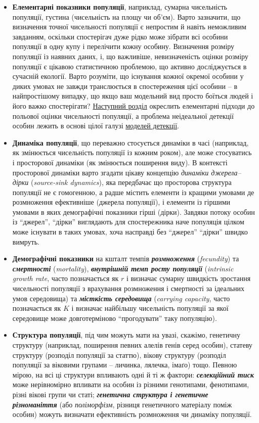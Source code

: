 \documentclass[
  11pt,
]{book}
\begin{document}
\begin{itemize}
\item
  \textbf{Елементарні показники популяції}, наприклад, сумарна чисельність популяції, густина (чисельність на площу чи об'єм). Варто зазначити, що визначення точної чисельності популяції є непростим й навіть неможливим завданням, оскільки спостерігач дуже рідко може зібрати всі особини популяції в одну купу і перелічити кожну особину. Визначення розміру популяції із наявних даних, і, що важливіше, невизначеність оцінки розміру популяції є цікавою статистичною проблемою, що активно досліджується в сучасній екології. Варто розуміти, що існування кожної окремої особини у диких умовах не завжди транслюється в спостереження цієї особини -- в найпростішому випадку, що якщо ваш модельний вид просто боїться людей і його важко спостерігати? \hyperref[cmr]{Наступний розділ} окреслить елементарні підходи до польової оцінки чисельності популяції, а проблема неідеальної детекції особин лежить в основі цілої галузі \hyperref[detectability]{моделей детекції}.
\item
  \textbf{Динаміка популяції}, що переважно стосується динаміки в часі (наприклад, як змінюється чисельність популяції із кожним роком), але може стосуватись і просторової динаміки (як змінюється поширення виду). В контексті просторової динаміки варто згадати цікаву концепцію \emph{динаміки джерела--дірки} (\emph{source-sink dynamics}), яка передбачає що просторова структура популяції не є гомогенною, а радше містить елементи із кращими умовами де розмноження ефективніше (джерела популяції), і елементи із гіршими умовами в яких демографічні показники гірші (дірки). Завдяки потоку особин із ``джерел'', ``дірки'' виглядають для спостережника наче популяція цілком може існувати в таких умовах, хоча насправді без ``джерел'' ``дірки'' швидко вимруть.
\item
  \textbf{Демографічні показники} на кшталт темпів \textbf{\emph{розмноження}} (\emph{fecundity}) та \textbf{\emph{смертності}} (\emph{mortality}), \textbf{\emph{внутрішній темп росту популяції}} (\emph{intrinsic growth rate}, часто позначається як \(r\) і визначає сумарну швидкість зростання чисельності популяції з врахування розмноження і смертності за ідеальних умов середовища) та \textbf{\emph{місткість середовища}} (\emph{carrying capacity}, часто позначається як \(K\) і визначає найбільшу чисельність популяції за якої середовище може довготерміново ``прогодувати'' таку популяцію).
\item
  \textbf{Структура популяції}, під чим можуть мати на увазі, скажімо, генетичну структуру (наприклад, поширення певних алелів генів серед особин), статеву структуру (розподіл популяції за статтю), вікову структуру (розподіл популяції за віковими групами -- личинка, лялечка, імаґо) тощо. Певною мірою, на всі ці структури впливають одні й ті ж фактори: \textbf{\emph{селекційний тиск}} може нерівномірно впливати на особин із різними генотипами, фенотипами, різні вікові групи чи статі; \textbf{\emph{генетична структура і генетичне різноманіття}} (або \emph{поліморфізм}, різниця генетичного матеріалу поміж особин) можуть визначати ефективність розмноження чи динаміку популяції.
\end{itemize}
\end{document}
